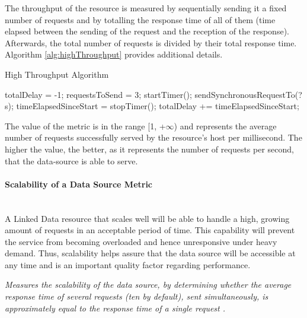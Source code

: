 The throughput of the resource is measured by sequentially sending it a fixed number of requests and by totalling the response time of all of them (time elapsed between the sending of the request and the reception of the response). Afterwards, the total number of requests is divided by their total response time. Algorithm \ref{alg:highThroughput} provides additional details.
\begin{algorithm}
\caption{High Throughput Algorithm} \label{alg:highThroughput}
\begin{algorithmic}[1]
\State totalDelay = -1;
\State requestsToSend = 3;
\EndProcedure
{}
\State startTimer();
\State sendSynchronousRequestTo(?s);
\EndFor
\State timeElapsedSinceStart = stopTimer();
\State totalDelay += timeElapsedSinceStart;
\EndIf
{}
\EndProcedure
\end{algorithmic}
\end{algorithm}
The value of the metric is in the range [1, +$\infty$) and represents the average number of requests successfully served by the resource's host per millisecond. The higher the value, the better, as it represents the number of requests per second, that the data-source is able to serve.



\paragraph{Scalability of a Data Source Metric} ~\\ %
A Linked Data resource that scales well will be able to handle a high, growing amount of requests in an acceptable period of time. This capability will prevent the service from becoming overloaded and hence unresponsive under heavy demand. Thus, scalability helps assure  that the data source will be accessible at any time and is an important quality factor regarding performance.
\begin{mdframed}[style=metricdefinition]
\emph{Measures the scalability of the data source, by determining whether the average response time of several requests (ten by default), sent simultaneously, is approximately equal to the response time of a single request \cite{Flemming2008}.}
\end{mdframed}

